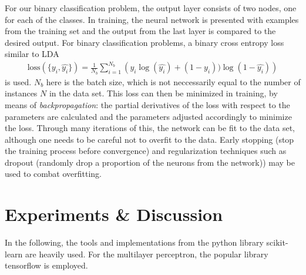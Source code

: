 \documentclass[12pt, a4paper]{scrartcl}
\begin{document}
For our binary classification problem, the output layer consists of two nodes, one for each of the classes. In training, the neural network is presented with examples from the training set and the output from the last layer is compared to the desired output. For binary classification problems, a binary cross entropy loss similar to LDA
\begin{align}
	\text{loss}(\{y_i, \hat{y_i}\}) = \frac{1}{N_b} \sum_{i=1}^{N_b} \left( y_i \log(\hat{y_i}) + (1-y_i)) \log(1-\hat{y_i}) \right)
\end{align}
is used. $N_b$ here is the batch size, which is not neccessarily equal to the number of instances $N$ in the data set. This loss can then be minimized in training, by means of \emph{backpropagation}: the partial derivatives of the loss with respect to the parameters are calculated and the parameters adjusted accordingly to minimize the loss.
Through many iterations of this, the network can be fit to the data set, although one needs to be careful not to overfit to the data.
Early stopping (stop the training process before convergence) and regularization techniques such as dropout (randomly drop a proportion of the neurons from the network)) may be used to combat overfitting.

\section{Experiments \& Discussion}
\label{sec:expe}
In the following, the tools and implementations from the python library scikit-learn \cite{scikit-learn} are heavily used. For the multilayer perceptron, the popular library tensorflow \cite{tensorflow2015-whitepaper} is employed.
\end{document}
